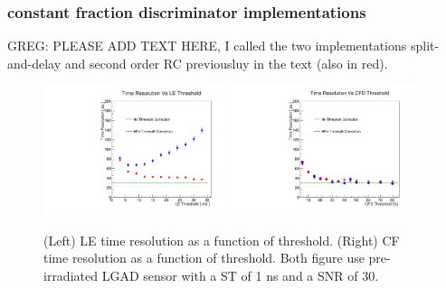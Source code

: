 \documentclass[preprint,1p]{elsarticle}
\begin{document}
\subsubsection{constant fraction discriminator implementations}\label{sed:cfd_realistic}
{\color{red}GREG: PLEASE ADD TEXT HERE, I called the two implementations split-and-delay and second order RC previousluy in the text (also in red)}.


  \begin{figure}[htbp]
    \centering
    \includegraphics[width=0.48\textwidth]{figs/ShapingTime1p0_SNR30_55MicronGain15Prerad_FIXED_NOISE_FIXED_SNR_V2_converted_TimeResolutionVsThresholdToT.pdf} \hfill
    \includegraphics[width=0.48\textwidth]{figs/ShapingTime1p0_SNR30_55MicronGain15Prerad_FIXED_NOISE_FIXED_SNR_V2_converted_TimeResolutionVsThresholdCFD.pdf}
    \caption{(Left) LE time resolution as a function of threshold.
    (Right) CF time resolution as a function of threshold.
    Both figure use pre-irradiated LGAD sensor with a ST of 1 ns and a SNR of 30.}
    \label{fig:time_resolution_scan}
  \end{figure}
\end{document}
